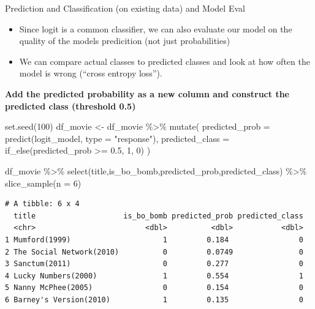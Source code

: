 \documentclass[
  10pt,
  ignorenonframetext,
]{beamer}
\newenvironment{Shaded}{\begin{snugshade}}{\end{snugshade}}
\newcommand{\AttributeTok}[1]{\textcolor[rgb]{0.40,0.45,0.13}{#1}}
\newcommand{\DecValTok}[1]{\textcolor[rgb]{0.68,0.00,0.00}{#1}}
\newcommand{\FloatTok}[1]{\textcolor[rgb]{0.68,0.00,0.00}{#1}}
\newcommand{\FunctionTok}[1]{\textcolor[rgb]{0.28,0.35,0.67}{#1}}
\newcommand{\NormalTok}[1]{\textcolor[rgb]{0.00,0.23,0.31}{#1}}
\newcommand{\OtherTok}[1]{\textcolor[rgb]{0.00,0.23,0.31}{#1}}
\newcommand{\SpecialCharTok}[1]{\textcolor[rgb]{0.37,0.37,0.37}{#1}}
\newcommand{\StringTok}[1]{\textcolor[rgb]{0.13,0.47,0.30}{#1}}
\begin{document}
\begin{frame}[fragile]{Prediction and Classification (on existing data)
and Model Eval}
\label{prediction-and-classification-on-existing-data-and-model-eval}
\scriptsize

\begin{itemize}
\item
  Since logit is a common classifier, we can also evaluate our model on
  the quality of the models predicition (not just probabilities)
\item
  We can compare actual classes to predicted classes and look at how
  often the model is wrong (``cross entropy loss'').
\end{itemize}

\textbf{Add the predicted probability as a new column and construct the
predicted class (threshold 0.5)}

\begin{Shaded}
\begin{Highlighting}[]
\FunctionTok{set.seed}\NormalTok{(}\DecValTok{100}\NormalTok{)}
\NormalTok{df\_movie }\OtherTok{\textless{}{-}}\NormalTok{ df\_movie }\SpecialCharTok{\%\textgreater{}\%}
  \FunctionTok{mutate}\NormalTok{(}
    \AttributeTok{predicted\_prob =} \FunctionTok{predict}\NormalTok{(logit\_model, }\AttributeTok{type =} \StringTok{"response"}\NormalTok{),}
    \AttributeTok{predicted\_class =} \FunctionTok{if\_else}\NormalTok{(predicted\_prob }\SpecialCharTok{\textgreater{}=} \FloatTok{0.5}\NormalTok{, }\DecValTok{1}\NormalTok{, }\DecValTok{0}\NormalTok{)}
\NormalTok{  )}

\NormalTok{df\_movie }\SpecialCharTok{\%\textgreater{}\%} \FunctionTok{select}\NormalTok{(title,is\_bo\_bomb,predicted\_prob,predicted\_class) }\SpecialCharTok{\%\textgreater{}\%} 
  \FunctionTok{slice\_sample}\NormalTok{(}\AttributeTok{n =} \DecValTok{6}\NormalTok{)}
\end{Highlighting}
\end{Shaded}

\begin{verbatim}
# A tibble: 6 x 4
  title                    is_bo_bomb predicted_prob predicted_class
  <chr>                         <dbl>          <dbl>           <dbl>
1 Mumford(1999)                     1         0.184                0
2 The Social Network(2010)          0         0.0749               0
3 Sanctum(2011)                     0         0.277                0
4 Lucky Numbers(2000)               1         0.554                1
5 Nanny McPhee(2005)                0         0.154                0
6 Barney's Version(2010)            1         0.135                0
\end{verbatim}
\end{frame}
\end{document}
